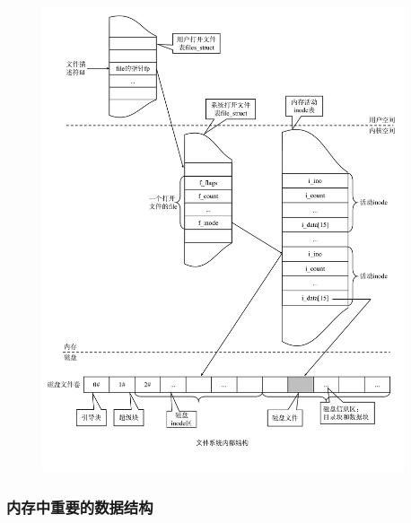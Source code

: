 \documentclass[cs4size,a4paper,10pt]{ctexart}
\begin{document}
	\begin{figure}[H]
		\centering
		\includegraphics[width=0.95\textwidth]{img/文件系统内部结构.pdf}
	\end{figure}

	\subsubsection{内存中重要的数据结构}
\end{document}
